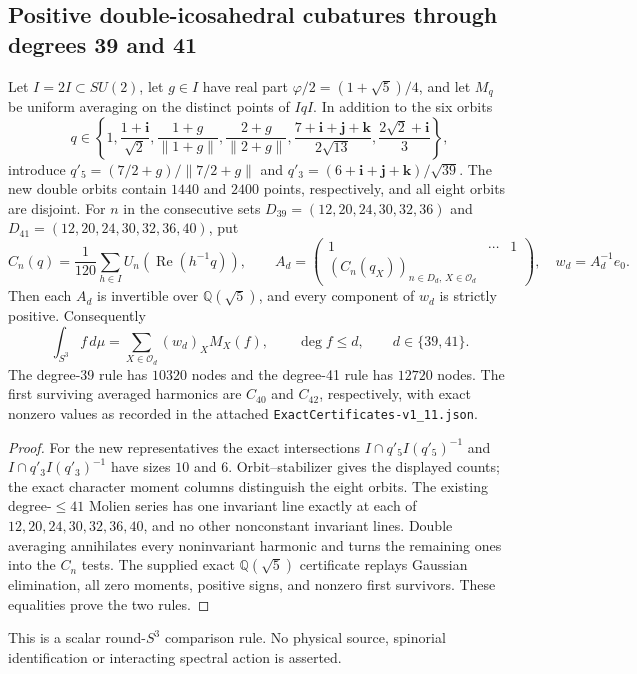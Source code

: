 \documentclass[11pt]{article}
\begin{document}
\subsection{Positive double-icosahedral cubatures through degrees 39 and 41}
\label{p1b:sec:cc111-positive41}
\begin{theorem}
\label{p1b:thm:cc111-positive41}
Let $I=2I\subset SU(2)$, let $g\in I$ have real part
$\varphi/2=(1+\sqrt5)/4$, and let $M_q$ be uniform averaging
on the distinct points of $IqI$. In addition to the six orbits
\[
q\in\left\{1,\frac{1+\mathbf i}{\sqrt2},
\frac{1+g}{\|1+g\|},\frac{2+g}{\|2+g\|},
\frac{7+\mathbf i+\mathbf j+\mathbf k}{2\sqrt{13}},
\frac{2\sqrt2+\mathbf i}{3}\right\},
\]
introduce $q'_5=(7/2+g)/\|7/2+g\|$ and
$q'_3=(6+\mathbf i+\mathbf j+\mathbf k)/\sqrt{39}$.
The new double orbits contain $1440$ and $2400$ points, respectively,
and all eight orbits are disjoint. For $n$ in the consecutive sets
$D_{39}=(12,20,24,30,32,36)$ and
$D_{41}=(12,20,24,30,32,36,40)$, put
\[
C_n(q)=\frac1{120}\sum_{h\in I}
U_n(\operatorname{Re}(h^{-1}q)),\qquad
A_{d}=\begin{pmatrix}1&\cdots&1\\
(C_n(q_X))_{n\in D_d,\,X\in\mathcal O_d}\end{pmatrix},
\quad w_d=A_d^{-1}e_0.
\]
Then each $A_d$ is invertible over $\mathbb Q(\sqrt5)$,
and every component of $w_d$ is strictly positive. Consequently
\[
\int_{S^3}f\,d\mu=\sum_{X\in\mathcal O_d}(w_d)_X M_X(f),
\qquad \deg f\le d,\qquad d\in\{39,41\}.
\]
The degree-39 rule has $10320$ nodes and the degree-41 rule has
$12720$ nodes. The first surviving averaged harmonics are $C_{40}$
and $C_{42}$, respectively, with exact nonzero values as recorded
in the attached \texttt{ExactCertificates-v1\_11.json}.
\end{theorem}
\begin{proof}
For the new representatives the exact intersections
$I\cap q'_5I(q'_5)^{-1}$ and $I\cap q'_3I(q'_3)^{-1}$ have sizes
$10$ and $6$. Orbit--stabilizer gives the displayed counts;
the exact character moment columns distinguish the eight orbits.
The existing degree-$\le41$ Molien series has one invariant line
exactly at each of $12,20,24,30,32,36,40$, and no other
nonconstant invariant lines. Double averaging annihilates every
noninvariant harmonic and turns the remaining ones into the
$C_n$ tests. The supplied exact $\mathbb Q(\sqrt5)$ certificate
replays Gaussian elimination, all zero moments, positive signs, and
nonzero first survivors. These equalities prove the two rules.
\end{proof}
\begin{remark}
This is a scalar round-$S^3$ comparison rule. No physical source,
spinorial identification or interacting spectral action is asserted.
\end{remark}
\end{document}

